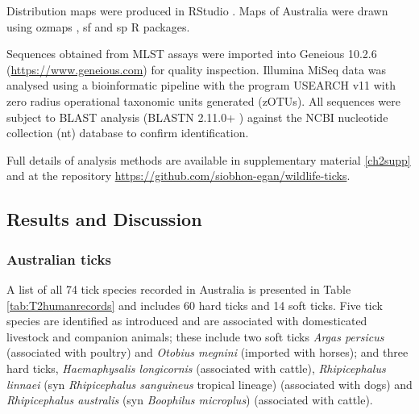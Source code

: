 \documentclass[a4paper, nobind]{templates/ociamthesis}
\begin{document}
Distribution maps were produced in RStudio \autocite{rstudioteamRStudioIntegratedDevelopment2015}.
Maps of Australia were drawn using ozmaps \autocite{SumnerOzmaps2021}, sf \autocite{PebesmaRsf2018} and sp \autocite{BivandRsp2013} R packages.

Sequences obtained from MLST assays were imported into Geneious 10.2.6 (\url{https://www.geneious.com}) for quality inspection.
Illumina MiSeq data was analysed using a bioinformatic pipeline with the program USEARCH v11 \autocite{edgarSearchClusteringOrders2010} with zero radius operational taxonomic units generated (zOTUs).
All sequences were subject to BLAST analysis (BLASTN 2.11.0+ \autocite{zhangGreedyAlgorithmAligning2000,morgulisDatabaseIndexingProduction2008}) against the NCBI nucleotide collection (nt) database to confirm identification.

Full details of analysis methods are available in supplementary material \ref{ch2supp} and at the repository \url{https://github.com/siobhon-egan/wildlife-ticks}.

\hypertarget{results-and-discussion}{%
\subsection{Results and Discussion}\label{results-and-discussion}}

\hypertarget{australian-ticks}{%
\subsubsection{Australian ticks}\label{australian-ticks}}

A list of all 74 tick species recorded in Australia is presented in Table \ref{tab:T2humanrecords} and includes 60 hard ticks and 14 soft ticks.
Five tick species are identified as introduced and are associated with domesticated livestock and companion animals; these include two soft ticks \emph{Argas persicus} (associated with poultry) and \emph{Otobius megnini} (imported with horses); and three hard ticks, \emph{Haemaphysalis longicornis} (associated with cattle), \emph{Rhipicephalus linnaei} (syn \emph{Rhipicephalus sanguineus} tropical lineage) (associated with dogs) and \emph{Rhipicephalus australis} (syn \emph{Boophilus microplus}) (associated with cattle).
\end{document}
